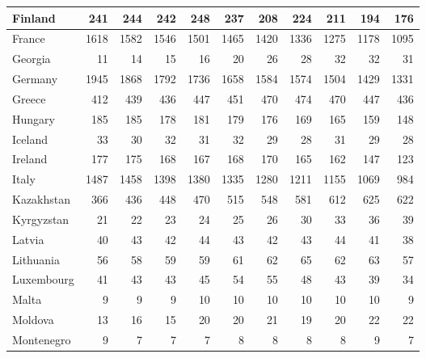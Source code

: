 \begin{table}
\begin{tabular}{|l|r|r|r|r|r|r|r|r|r|r|}
                       Finland&    241&    244&    242&    248&    237&    208&    224&    211&    194&    176\\\hline
                        France&   1618&   1582&   1546&   1501&   1465&   1420&   1336&   1275&   1178&   1095\\\hline
                       Georgia&     11&     14&     15&     16&     20&     26&     28&     32&     32&     31\\\hline
                       Germany&   1945&   1868&   1792&   1736&   1658&   1584&   1574&   1504&   1429&   1331\\\hline
                        Greece&    412&    439&    436&    447&    451&    470&    474&    470&    447&    436\\\hline
                       Hungary&    185&    185&    178&    181&    179&    176&    169&    165&    159&    148\\\hline
                       Iceland&     33&     30&     32&     31&     32&     29&     28&     31&     29&     28\\\hline
                       Ireland&    177&    175&    168&    167&    168&    170&    165&    162&    147&    123\\\hline
                         Italy&   1487&   1458&   1398&   1380&   1335&   1280&   1211&   1155&   1069&    984\\\hline
                    Kazakhstan&    366&    436&    448&    470&    515&    548&    581&    612&    625&    622\\\hline
                    Kyrgyzstan&     21&     22&     23&     24&     25&     26&     30&     33&     36&     39\\\hline
                        Latvia&     40&     43&     42&     44&     43&     42&     43&     44&     41&     38\\\hline
                     Lithuania&     56&     58&     59&     59&     61&     62&     65&     62&     63&     57\\\hline
                    Luxembourg&     41&     43&     43&     45&     54&     55&     48&     43&     39&     34\\\hline
                         Malta&      9&      9&      9&     10&     10&     10&     10&     10&     10&      9\\\hline
                       Moldova&     13&     16&     15&     20&     20&     21&     19&     20&     22&     22\\\hline
                    Montenegro&      9&      7&      7&      7&      8&      8&      8&      8&      9&      7\\\hline

\end{tabular}
\end{table}
